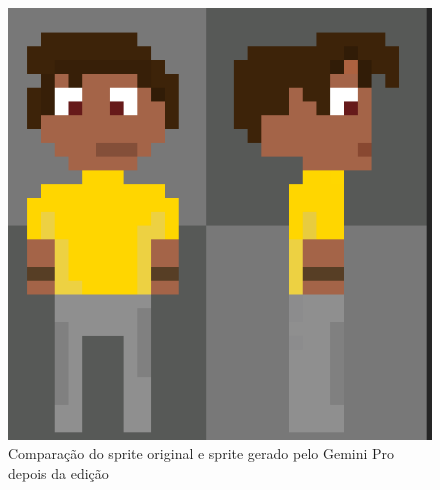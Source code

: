 \begin{figure}[htbp]
    \centering
    \caption{\small Comparação do sprite original e sprite gerado pelo Gemini Pro depois da edição}
    \label{fig:pixelLabFixSideViewComparaDepois}
    \includegraphics[width=0.4\linewidth]{figs/pixelLab/dia3/fix.PNG}
\end{figure}

